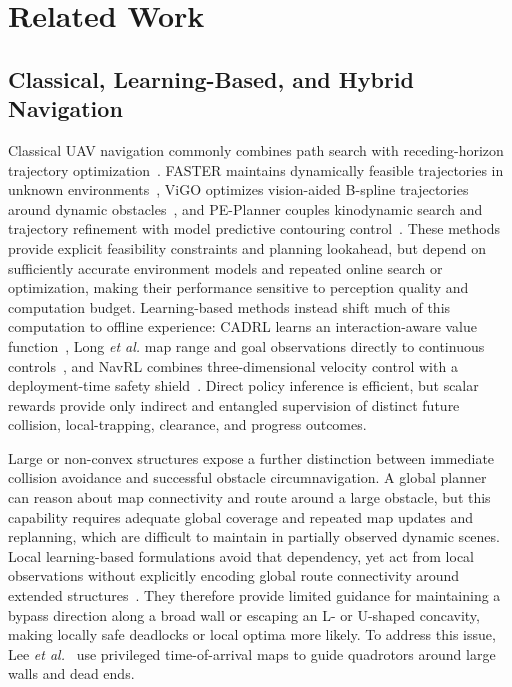 \documentclass[letterpaper, 10 pt, conference]{ieeeconf}
\begin{document}
\section{Related Work}\label{sec:related_work}

\subsection{Classical, Learning-Based, and Hybrid Navigation}

Classical UAV navigation commonly combines path search with receding-horizon trajectory optimization~\cite{faster,vigo,pe_planner}. FASTER maintains dynamically feasible trajectories in unknown environments~\cite{faster}, ViGO optimizes vision-aided B-spline trajectories around dynamic obstacles~\cite{vigo}, and PE-Planner couples kinodynamic search and trajectory refinement with model predictive contouring control~\cite{pe_planner}. These methods provide explicit feasibility constraints and planning lookahead, but depend on sufficiently accurate environment models and repeated online search or optimization, making their performance sensitive to perception quality and computation budget. Learning-based methods instead shift much of this computation to offline experience: CADRL learns an interaction-aware value function~\cite{cadrl}, Long \emph{et al.} map range and goal observations directly to continuous controls~\cite{long2018}, and NavRL combines three-dimensional velocity control with a deployment-time safety shield~\cite{navrl}. Direct policy inference is efficient, but scalar rewards provide only indirect and entangled supervision of distinct future collision, local-trapping, clearance, and progress outcomes.

Large or non-convex structures expose a further distinction between immediate collision avoidance and successful obstacle circumnavigation. A global planner can reason about map connectivity and route around a large obstacle, but this capability requires adequate global coverage and repeated map updates and replanning, which are difficult to maintain in partially observed dynamic scenes. Local learning-based formulations avoid that dependency, yet act from local observations without explicitly encoding global route connectivity around extended structures~\cite{long2018,navrl,drl_vo}. They therefore provide limited guidance for maintaining a bypass direction along a broad wall or escaping an L- or U-shaped concavity, making locally safe deadlocks or local optima more likely. To address this issue, Lee \emph{et al.}~\cite{lee2026privileged} use privileged time-of-arrival maps to guide quadrotors around large walls and dead ends.
\end{document}
